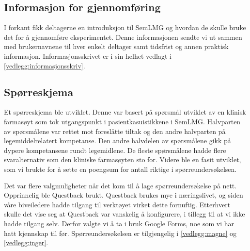 \subsection{Informasjon for gjennomføring}
I forkant fikk deltagerne en introduksjon til SemLMG og hvordan de skulle bruke det for å gjennomføre eksperimentet. Denne informasjonen sendte vi ut sammen med brukernavnene til hver enkelt deltager samt tidsfrist og annen praktisk informasjon. Informasjonsskrivet er i sin helhet vedlagt i \ref{vedlegg:informasjonsskriv}.

\subsection{Spørreskjema}
Et spørreskjema ble utviklet. Denne var basert på spørsmål utviklet av en klinisk farmasøyt som tok utgangspunkt i pasientkasuistikkene i SemLMG. Halvparten av spørsmålene var rettet mot foreslåtte tiltak og den andre halvparten på legemiddelrelatert kompetanse. Den andre halvdelen av spørsmålene gikk på dypere kompetansene rundt legemidlene. De fleste spørsmålene hadde flere svaralternativ som den kliniske farmasøyten sto for. Videre ble en fasit utviklet, som vi brukte for å sette en poengsum for antall riktige i spørreundersøkelsen.

Det var flere valgmuligheter når det kom til å lage spørreundersøkelse på nett. Opprinnelig ble Questback brukt. Questback brukes mye i næringslivet, og siden våre biveiledere hadde tilgang til verktøyet virket dette fornuftig. Etterhvert skulle det vise seg at Questback var vanskelig å konfigurere, i tillegg til at vi ikke hadde tilgang selv. Derfor valgte vi å ta i bruk Google Forms, noe som vi har hatt kjennskap til før. Spørreundersøkelsen er tilgjengelig i \ref{vedlegg:magne} og \ref{vedlegg:inger}.

